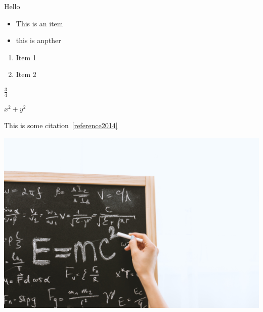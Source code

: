 \documentclass{article}
\begin{document}
Hello

\begin{itemize}
    \item This is an item
    \item this is anpther 
\end{itemize}

\begin{enumerate}
    \item Item 1
    \item Item 2
    
\end{enumerate}

$\frac{3}{4}$


$x^2+y^2$

This is some citation~\ref{reference2014}



\includegraphics[scale=0.05]{images/maths}

\end{document}
